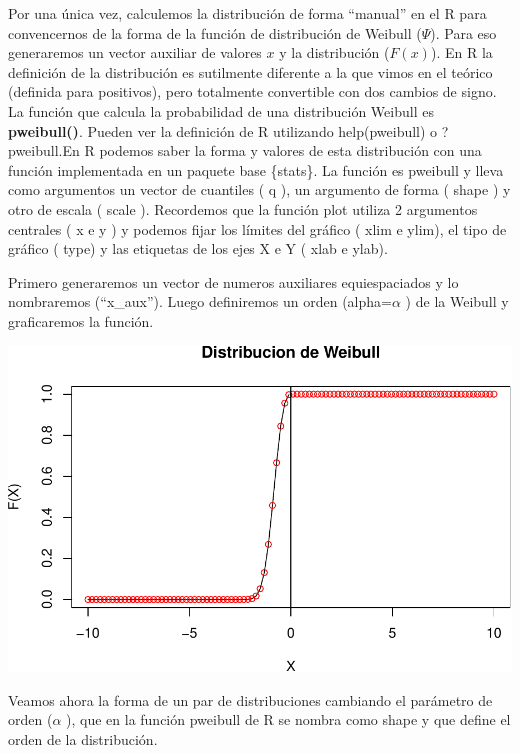 \documentclass[
  oneside]{book}
\begin{document}
Por una única vez, calculemos la distribución de forma ``manual'' en el
R para convencernos de la forma de la función de distribución de Weibull
(\(\Psi\)). Para eso generaremos un vector auxiliar de valores \(x\) y
la distribución (\(F(x)\)). En R la definición de la distribución es
sutilmente diferente a la que vimos en el teórico (definida para
positivos), pero totalmente convertible con dos cambios de signo. La
función que calcula la probabilidad de una distribución Weibull es
\textbf{pweibull()}. Pueden ver la definición de R utilizando
help(pweibull) o ?pweibull.En R podemos saber la forma y valores de esta
distribución con una función implementada en un paquete base \{stats\}.
La función es pweibull y lleva como argumentos un vector de cuantiles (
q ), un argumento de forma ( shape ) y otro de escala ( scale ).
Recordemos que la función plot utiliza 2 argumentos centrales ( x e y )
y podemos fijar los límites del gráfico ( xlim e ylim), el tipo de
gráfico ( type) y las etiquetas de los ejes X e Y ( xlab e ylab).

Primero generaremos un vector de numeros auxiliares equiespaciados y lo
nombraremos (``x\_aux''). Luego definiremos un orden (alpha=\(\alpha\) )
de la Weibull y graficaremos la función.

\includegraphics{extremales_files/figure-latex/unnamed-chunk-8-1.pdf}

Veamos ahora la forma de un par de distribuciones cambiando el parámetro
de orden (\(\alpha\) ), que en la función pweibull de R se nombra como
shape y que define el orden de la distribución.
\end{document}
